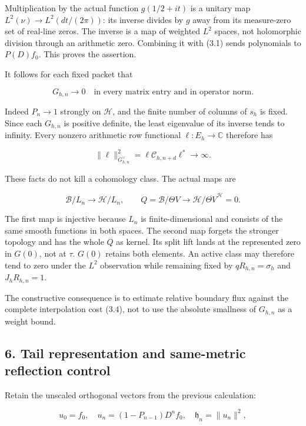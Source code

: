 \documentclass[
]{article}
\begin{document}
Multiplication by the actual function \(g(1/2+it)\) is a unitary map
\(L^2(\nu)\to L^2(dt/(2\pi))\): its inverse divides by \(g\) away from
its measure-zero set of real-line zeros. The inverse is a map of
weighted \(L^2\) spaces, not holomorphic division through an arithmetic
zero. Combining it with (3.1) sends polynomials to \(P(D)f_0\). This
proves the assertion.

It follows for each fixed packet that

\[\boxed{G_{h,n}\longrightarrow0\quad\text{in every matrix entry and in operator norm}.}\tag{5.1}\]

Indeed \(P_n\to1\) strongly on \(\mathcal H\), and the finite number of
columns of \(s_h\) is fixed. Since each \(G_{h,n}\) is positive
definite, the least eigenvalue of its inverse tends to infinity. Every
nonzero arithmetic row functional \(\ell:E_h\to\mathbb C\) therefore has

\[\boxed{\|\ell\|_{G_{h,n}^{\vee}}^2=
\ell\mathcal C_{h,n+d}\ell^*\longrightarrow\infty.}\tag{5.2}\]

These facts do not kill a cohomology class. The actual maps are

\[\mathscr B/L_n\longrightarrow\mathcal H/L_n,\qquad
Q=\mathscr B/\Theta V\longrightarrow\mathcal H/\overline{\Theta V}^{\mathcal H}=0.\tag{5.3}\]

The first map is injective because \(L_n\) is finite-dimensional and
consists of the same smooth functions in both spaces. The second map
forgets the stronger topology and has the whole \(Q\) as kernel. Its
split lift lands at the represented zero in \(G(0)\), not at \(\tau\).
\(G(0)\) retains both elements. An active class may therefore tend to
zero under the \(L^2\) observation while remaining fixed by
\(qR_{h,n}=\sigma_h\) and \(J_hR_{h,n}=1\).

The constructive consequence is to estimate relative boundary flux
against the complete interpolation cost (3.4), not to use the absolute
smallness of \(G_{h,n}\) as a weight bound.

\subsection{6. Tail representation and same-metric reflection
control}\label{tail-representation-and-same-metric-reflection-control}

Retain the unscaled orthogonal vectors from the previous calculation:

\[u_0=f_0,\quad u_n=(1-P_{n-1})D^nf_0,\quad\mathfrak h_n=\|u_n\|^2,\]
\end{document}
